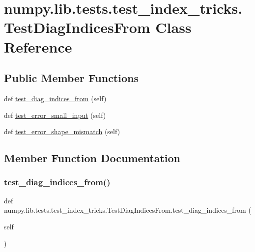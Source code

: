 \hypertarget{classnumpy_1_1lib_1_1tests_1_1test__index__tricks_1_1TestDiagIndicesFrom}{}\section{numpy.\+lib.\+tests.\+test\+\_\+index\+\_\+tricks.\+Test\+Diag\+Indices\+From Class Reference}
\label{classnumpy_1_1lib_1_1tests_1_1test__index__tricks_1_1TestDiagIndicesFrom}
\subsection*{Public Member Functions}
\begin{DoxyCompactItemize}
\item 
def \hyperlink{classnumpy_1_1lib_1_1tests_1_1test__index__tricks_1_1TestDiagIndicesFrom_af4522a62af7ab8ea0e0e159ee1ff74d7}{test\+\_\+diag\+\_\+indices\+\_\+from} (self)
\item 
def \hyperlink{classnumpy_1_1lib_1_1tests_1_1test__index__tricks_1_1TestDiagIndicesFrom_acd33f954f3bf85ee601902f0740afbdc}{test\+\_\+error\+\_\+small\+\_\+input} (self)
\item 
def \hyperlink{classnumpy_1_1lib_1_1tests_1_1test__index__tricks_1_1TestDiagIndicesFrom_ae72e96f3291e570c135a05beaf77c3be}{test\+\_\+error\+\_\+shape\+\_\+mismatch} (self)
\end{DoxyCompactItemize}


\subsection{Member Function Documentation}
\mbox{\label{classnumpy_1_1lib_1_1tests_1_1test__index__tricks_1_1TestDiagIndicesFrom_af4522a62af7ab8ea0e0e159ee1ff74d7}} 
\subsubsection{\texorpdfstring{test\+\_\+diag\+\_\+indices\+\_\+from()}{test\_diag\_indices\_from()}}
{\footnotesize\ttfamily def numpy.\+lib.\+tests.\+test\+\_\+index\+\_\+tricks.\+Test\+Diag\+Indices\+From.\+test\+\_\+diag\+\_\+indices\+\_\+from (\begin{DoxyParamCaption}\item[{}]{self }\end{DoxyParamCaption})}

